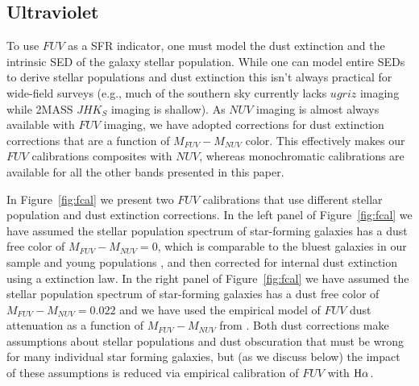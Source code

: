 \documentclass[preprint]{aastex61}
\begin{document}

\subsection{Ultraviolet}

To use $FUV$ as a SFR indicator, one must model the dust extinction and the intrinsic SED of the galaxy stellar population. While one can model entire SEDs to derive stellar populations and dust extinction \citep[e.g.,][]{dac08,nol09} this isn't always practical for wide-field surveys (e.g., much of the southern sky currently lacks $ugriz$ imaging while 2MASS $JHK_S$ imaging is shallow). As $NUV$ imaging is almost always available with $FUV$ imaging, we have adopted corrections for dust extinction corrections that are a function of $M_{FUV}-M_{NUV}$ color. This effectively makes our $FUV$ calibrations composites with $NUV$, whereas monochromatic calibrations are available for all the other bands presented in this paper.

In Figure~\ref{fig:fcal} we present two $FUV$ calibrations that use different stellar population and dust extinction corrections. In the left panel of Figure~\ref{fig:fcal} we have assumed the stellar population spectrum of star-forming galaxies has a dust free color of $M_{FUV}-M_{NUV}=0$, which is comparable to the bluest galaxies in our sample and young populations \citep[e.g.,][]{gil07,lis08}, and then corrected for internal dust extinction using a \citet{cal00} extinction law. In the right panel of Figure~\ref{fig:fcal} we have assumed the stellar population spectrum of star-forming galaxies has a dust free color of $M_{FUV}-M_{NUV}=0.022$ \citep{hao11} and we have used the empirical model of $FUV$ dust attenuation as a function of $M_{FUV}-M_{NUV}$ from \citet{hao11}. Both dust corrections make assumptions about stellar populations and dust obscuration that must be wrong for many individual star forming galaxies, but (as we discuss below) the impact of these assumptions is reduced via empirical calibration of $FUV$ with ${\rm H\alpha}$.
\end{document}
